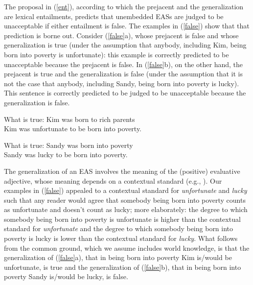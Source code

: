 \documentclass[11pt,fleqn]{article}
\def\infelic{{\leavevmode\llap{\#}}}
\newcommand{\6}{\mbox{$[\hspace*{-.6mm}[$}}
\newcommand{\9}{\mbox{$]\hspace*{-.6mm}]$}}
\begin{document}
The proposal in (\ref{ent}), according to which the prejacent and the generalization are lexical entailments, predicts that unembedded EASs are judged to be unacceptable if either entailment is false. The examples in (\ref{false}) show that that prediction is borne out. Consider (\ref{false}a), whose prejacent is false and whose generalization is true (under the assumption that anybody, including Kim, being born into poverty is unfortunate): this example is correctly predicted to be unacceptable because the prejacent is false. In (\ref{false}b), on the other hand, the prejacent is true and the generalization is false (under the assumption that it is not the case that anybody, including Sandy, being born into poverty is lucky). This sentence is correctly predicted to be judged to be unacceptable because the generalization is false. 

\begin{exe}
\ex\label{false}
\begin{xlist}
\ex What is true: Kim was born to rich parents
\\ \infelic Kim was unfortunate to be born into poverty.

\ex What is true: Sandy was born into poverty
\\ \infelic Sandy was lucky to be born into poverty.

\end{xlist}
\end{exe}

The generalization of an EAS involves the meaning of the (positive) evaluative adjective, whose meaning depends on a contextual standard (e.g., \citealt{kennedy2001}). Our examples in (\ref{false}) appealed to a contextual standard for {\em unfortunate} and {\em lucky} such that any reader would agree that somebody being born into poverty counts as unfortunate and doesn't count as lucky; more elaborately: the degree to which somebody being born into poverty is unfortunate is higher than the contextual standard for {\em unfortunate} and the degree to which somebody being born into poverty is lucky is lower than the contextual standard for {\em lucky}. What follows from the common ground, which we assume includes world knowledge, is that the generalization of (\ref{false}a), that in being born into poverty Kim is/would be unfortunate, is true and the generalization of (\ref{false}b), that in being born into poverty Sandy is/would be lucky, is false. 
\end{document}
